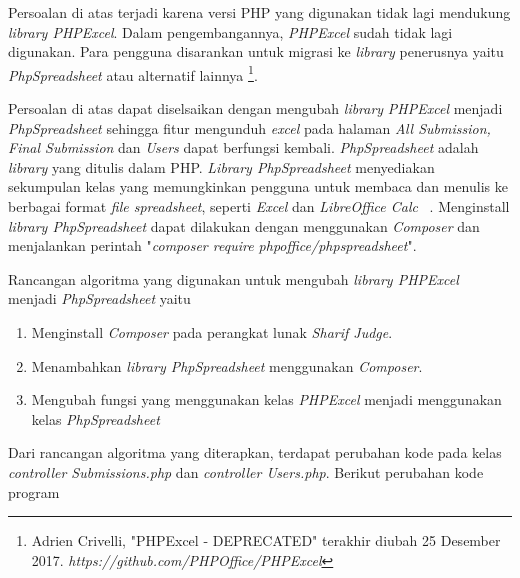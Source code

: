 	Persoalan di atas terjadi karena versi PHP yang digunakan tidak lagi mendukung \textit{library PHPExcel}. Dalam pengembangannya, \textit{PHPExcel} sudah tidak lagi digunakan. Para pengguna disarankan untuk migrasi ke \textit{library} penerusnya yaitu \textit{PhpSpreadsheet} atau alternatif lainnya \footnote{Adrien Crivelli, "PHPExcel - DEPRECATED" terakhir diubah 25 Desember 2017. \textit{https://github.com/PHPOffice/PHPExcel}}.
	
	Persoalan di atas dapat diselsaikan dengan mengubah \textit{library} \textit{PHPExcel} menjadi \textit{PhpSpreadsheet} sehingga fitur mengunduh \textit{excel} pada halaman \textit{All Submission, Final Submission} dan \textit{Users} dapat berfungsi kembali. \textit{PhpSpreadsheet} adalah \textit{library} yang ditulis dalam PHP. \textit{Library PhpSpreadsheet} menyediakan sekumpulan kelas yang memungkinkan pengguna untuk membaca dan menulis ke berbagai format \textit{file spreadsheet}, seperti \textit{Excel} dan \textit{LibreOffice Calc} ~\cite{phpoffice:10:phpspreadsheet}. Menginstall \textit{library PhpSpreadsheet} dapat dilakukan dengan menggunakan \textit{Composer} dan menjalankan perintah "\textit{composer require phpoffice/phpspreadsheet}".
	
	Rancangan algoritma yang digunakan untuk mengubah \textit{library PHPExcel} menjadi \textit{PhpSpreadsheet} yaitu
	\begin{enumerate}
		\item Menginstall \textit{Composer} pada perangkat lunak \textit{Sharif Judge}.
		\item Menambahkan \textit{library PhpSpreadsheet} menggunakan \textit{Composer}.
		\item Mengubah fungsi yang menggunakan kelas \textit{PHPExcel} menjadi menggunakan kelas \textit{PhpSpreadsheet}
	\end{enumerate}
	
	Dari rancangan algoritma yang diterapkan, terdapat perubahan kode pada kelas \textit{controller Submissions.php} dan \textit{controller Users.php}. Berikut perubahan kode program
	
